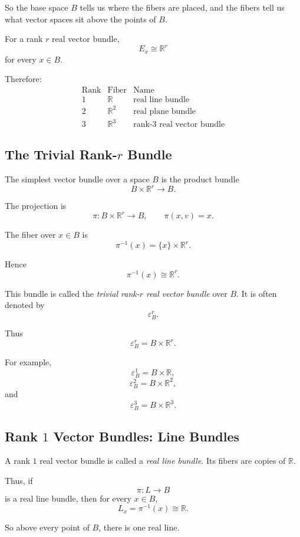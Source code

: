 \documentclass[12pt,a4paper]{article}
\theoremstyle{notespace}
\begin{document}
So the base space \(B\) tells us where the fibers are placed, and the fibers tell us what vector spaces sit above the points of \(B\).

For a rank \(r\) real vector bundle,
\[
E_x\cong \mathbb R^r
\]
for every \(x\in B\).

Therefore:
\[
\begin{array}{c|c|c}
	\text{Rank} & \text{Fiber} & \text{Name} \\
	\hline
	1 & \mathbb R & \text{real line bundle} \\
	2 & \mathbb R^2 & \text{real plane bundle} \\
	3 & \mathbb R^3 & \text{rank-}3\text{ real vector bundle}
\end{array}
\]

\subsection{The Trivial Rank-\(r\) Bundle}

The simplest vector bundle over a space \(B\) is the product bundle
\[
B\times \mathbb R^r\longrightarrow B.
\]

The projection is
\[
\pi:B\times \mathbb R^r\longrightarrow B,
\qquad
\pi(x,v)=x.
\]

The fiber over \(x\in B\) is
\[
\pi^{-1}(x)=\{x\}\times \mathbb R^r.
\]

Hence
\[
\pi^{-1}(x)\cong \mathbb R^r.
\]

This bundle is called the \emph{trivial rank-\(r\) real vector bundle} over \(B\). It is often denoted by
\[
\varepsilon^r_B.
\]

Thus
\[
\varepsilon^r_B=B\times \mathbb R^r.
\]

For example,
\[
\varepsilon^1_B=B\times \mathbb R,
\]
\[
\varepsilon^2_B=B\times \mathbb R^2,
\]
and
\[
\varepsilon^3_B=B\times \mathbb R^3.
\]

\subsection{Rank \(1\) Vector Bundles: Line Bundles}

A rank \(1\) real vector bundle is called a \emph{real line bundle}. Its fibers are copies of \(\mathbb R\).

Thus, if
\[
\pi:L\to B
\]
is a real line bundle, then for every \(x\in B\),
\[
L_x=\pi^{-1}(x)\cong \mathbb R.
\]

So above every point of \(B\), there is one real line.
\end{document}
